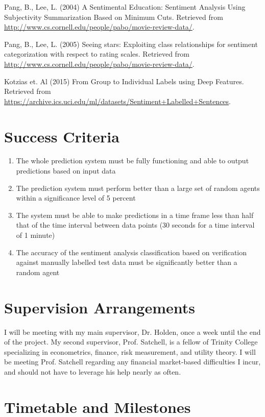 \documentclass[12pt,a4paper,twoside,openright]{report}
\begin{document}
\noindent [6] Pang, B., Lee, L. (2004) A Sentimental Education: Sentiment Analysis Using Subjectivity
Summarization Based on Minimum Cuts. Retrieved from
\url{http://www.cs.cornell.edu/people/pabo/movie-review-data/}.

\noindent [7] Pang, B., Lee, L. (2005) Seeing stars: Exploiting class relationships for sentiment
categorization with respect to rating scales. Retrieved from
\url{http://www.cs.cornell.edu/people/pabo/movie-review-data/}.

\noindent [8] Kotzias et. Al (2015) From Group to Individual Labels using Deep Features. Retrieved from
\url{https://archive.ics.uci.edu/ml/datasets/Sentiment+Labelled+Sentences}.

\section*{Success Criteria}
\begin{enumerate}
\item
The whole prediction system must be fully functioning and able to output predictions
based on input data

\item
The prediction system must perform better than a large set of random agents within a
significance level of 5 percent

\item
The system must be able to make predictions in a time frame less than half that of the
time interval between data points (30 seconds for a time interval of 1 minute)

\item
The accuracy of the sentiment analysis classification based on verification against
manually labelled test data must be significantly better than a random agent
\end{enumerate}

\section*{Supervision Arrangements}
I will be meeting with my main supervisor, Dr. Holden, once a week until the end of the project.
My second supervisor, Prof. Satchell, is a fellow of Trinity College specializing in econometrics,
finance, risk measurement, and utility theory. I will be meeting Prof. Satchell regarding any
financial market-based difficulties I incur, and should not have to leverage his help nearly as
often.

\section*{Timetable and Milestones}
\end{document}
